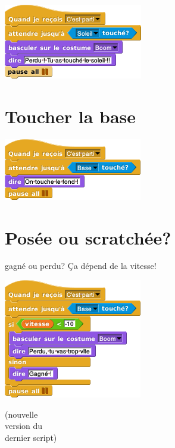 \documentclass[a7paper,pagesize,DIV=14,10pt]{scrbook}
\begin{document}
\includegraphics[scale=.5]{img/fusee_fin-soleil.png}



\newpage
\section*{Toucher la base}
\vspace{-.7\baselineskip}


\includegraphics[scale=.5]{img/fusee_touche-fond.png}

\vspace{-.7\baselineskip}
\section*{Posée ou scratchée?}
\vspace{-.7\baselineskip}
gagné ou perdu? 
Ça dépend de la vitesse!

\begin{minipage}{.65\linewidth}
\includegraphics[scale=.5]{img/fusee_fin-base.png}
\end{minipage}
\begin{minipage}{.34\linewidth}
  \small (nouvelle \\
  version du\\ 
  dernier script)
\end{minipage}
\end{document}
